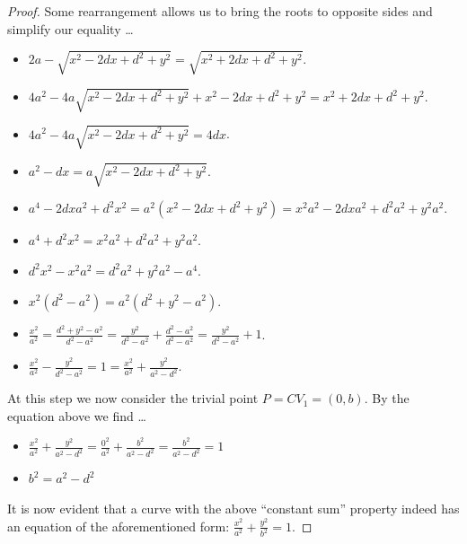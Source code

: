 \documentclass[12pt]{article}
\newcommand{\ds}{\displaystyle}
\theoremstyle{plain}
\begin{document}
\begin{proof}
  \newpage

  Some rearrangement allows us to bring the roots to opposite sides and simplify our equality \dots

  \begin{itemize}
    \item $ \ds 2a - \sqrt{x^{2} - 2dx + d^{2} + y^{2}} = \sqrt{x^{2} + 2dx + d^{2} + y^{2}} $.
    \item $ \ds 4a^{2} - 4a\sqrt{x^{2} - 2dx + d^{2} + y^{2}} + x^{2} - 2dx + d^{2} + y^{2} = x^{2} + 2dx + d^{2} + y^{2} $.
    \item $ \ds 4a^{2} - 4a\sqrt{x^{2} - 2dx + d^{2} + y^{2}} = 4dx  $.
    \item $ \ds a^{2} - dx = a\sqrt{x^{2} - 2dx + d^{2} + y^{2}} $.
    \item $ \ds a^{4} - 2dxa^{2} + d^{2}x^{2} = a^{2}(x^{2} - 2dx + d^{2} + y^{2}) = x^{2}a^{2} - 2dxa^{2} + d^{2}a^{2} + y^{2}a^{2} $.
    \item $ \ds a^{4} + d^{2}x^{2} = x^{2}a^{2} + d^{2}a^{2} + y^{2}a^{2} $.
    \item $ \ds d^{2}x^{2} - x^{2}a^{2} = d^{2}a^{2} + y^{2}a^{2} - a^{4} $.
    \item $ \ds x^{2}(d^{2} - a^{2}) = a^{2}(d^{2} + y^{2} - a^{2}) $.
    \item $ \ds \frac{x^{2}}{a^{2}} = \frac{d^{2} + y^{2} - a^{2}}{d^{2} - a^{2}} = \frac{y^{2}}{d^{2} - a^{2}} + \frac{d^{2} - a^{2}}{d^{2} - a^{2}} = \frac{y^{2}}{d^{2} - a^{2}} + 1 $.
    \item $ \ds \frac{x^{2}}{a^{2}} - \frac{y^{2}}{d^{2} - a^{2}} = 1 = \frac{x^{2}}{a^{2}} + \frac{y^{2}}{a^{2} - d^{2}} $.
  \end{itemize}

  At this step we now consider the trivial point $ P = CV_{1} = (0,b) $. By the equation above we find \dots

  \begin{itemize}
    \item $ \ds \frac{x^{2}}{a^{2}} + \frac{y^{2}}{a^{2} - d^{2}} = \frac{0^{2}}{a^{2}} + \frac{b^{2}}{a^{2} - d^{2}} = \frac{b^{2}}{a^{2} - d^{2}} = 1 $
    \item $ \ds b^{2} = a^{2} - d^{2} $
  \end{itemize}

  It is now evident that a curve with the above ``constant sum'' property indeed has an equation of the aforementioned form: $ \ds \frac{x^2}{a^2} + \frac{y^2}{b^2} = 1 $.
\end{proof}
\end{document}
